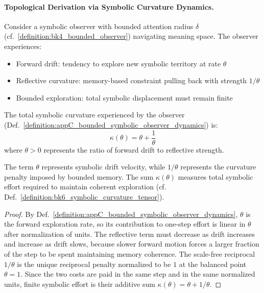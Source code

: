 \paragraph{Topological Derivation via Symbolic Curvature Dynamics.}
\label{subsec:appC_topological_derivation_symbolic_curvature}

\begin{definition}
\label{definition:appC_bounded_symbolic_observer_dynamics}
Consider a symbolic observer with bounded attention radius $\delta$ (cf.~\ref{definition:bk4_bounded_observer}) navigating meaning space. The observer experiences:
\begin{itemize}
\item Forward drift: tendency to explore new symbolic territory at rate $\theta$
\item Reflective curvature: memory-based constraint pulling back with strength $1/\theta$
\item Bounded exploration: total symbolic displacement must remain finite
\end{itemize}
\end{definition}

\begin{definition}
\label{definition:appC_symbolic_curvature_function}
The total symbolic curvature experienced by the observer (Def.~\ref{definition:appC_bounded_symbolic_observer_dynamics}) is:
\[
\kappa(\theta) = \theta + \frac{1}{\theta}
\]
where $\theta > 0$ represents the ratio of forward drift to reflective strength.
\end{definition}

\begin{lemma}
\label{lemma:appC_geometric_interpretation_curvature}
The term $\theta$ represents symbolic drift velocity, while $1/\theta$ represents
the curvature penalty imposed by bounded memory. The sum $\kappa(\theta)$ measures
total symbolic effort required to maintain coherent exploration (cf.
Def.~\ref{definition:bk6_symbolic_curvature_tensor}).
\end{lemma}

\begin{proof}
\label{proof:appC_geometric_interpretation_curvature}
By Def.~\ref{definition:appC_bounded_symbolic_observer_dynamics}, $\theta$ is the
forward exploration rate, so its contribution to one-step effort is linear in
$\theta$ after normalization of units. The reflective term must decrease as drift
increases and increase as drift slows, because slower forward motion forces a
larger fraction of the step to be spent maintaining memory coherence. The
scale-free reciprocal $1/\theta$ is the unique reciprocal penalty normalized to
be $1$ at the balanced point $\theta=1$. Since the two costs are paid in the same
step and in the same normalized units, finite symbolic effort is their additive
sum $\kappa(\theta)=\theta+1/\theta$.
\end{proof}

